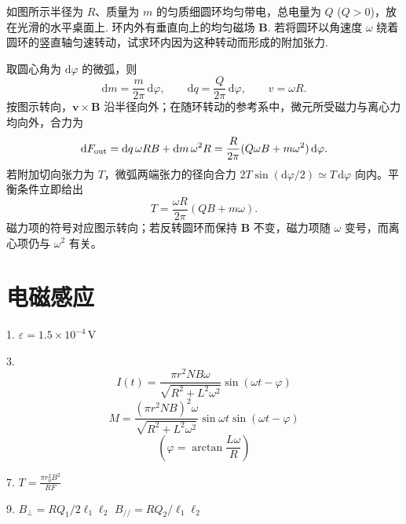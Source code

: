 \begin{exercise}\label{ex:17.13}
如图所示半径为 $R$、质量为 $m$ 的匀质细圆环均匀带电，总电量为 $Q$ ($Q>0$)，放在光滑的水平桌面上. 环内外有垂直向上的均匀磁场 $\boldsymbol{B}$. 若将圆环以角速度 $\omega$ 绕着圆环的竖直轴匀速转动，试求环内因为这种转动而形成的附加张力.
\begin{center}
\end{center}
\end{exercise}
\begin{solution}
取圆心角为 $\mathrm{d}\varphi$ 的微弧，则
\[
\mathrm{d}m=\frac{m}{2\pi}\,\mathrm{d}\varphi,\qquad
\mathrm{d}q=\frac{Q}{2\pi}\,\mathrm{d}\varphi,\qquad
v=\omega R.
\]
按图示转向，$\boldsymbol v\times\boldsymbol B$ 沿半径向外；在随环转动的参考系中，微元所受磁力与离心力均向外，合力为
\[
\mathrm{d}F_{\rm out}
=\mathrm{d}q\,\omega RB+\mathrm{d}m\,\omega^2R
=\frac{R}{2\pi}(Q\omega B+m\omega^2)\,\mathrm{d}\varphi.
\]
若附加切向张力为 $T$，微弧两端张力的径向合力
$2T\sin(\mathrm{d}\varphi/2)\simeq T\,\mathrm{d}\varphi$ 向内。平衡条件立即给出
\[
\boxed{T=\frac{\omega R}{2\pi}(QB+m\omega)}.
\]
磁力项的符号对应图示转向；若反转圆环而保持 $\boldsymbol B$ 不变，磁力项随 $\omega$ 变号，而离心项仍与 $\omega^2$ 有关。
\end{solution}



\chapter{电磁感应}

\begin{oddanswers}
1. $\varepsilon = 1.5 \times 10^{-4}\,\mathrm{V}$

3. 
$$I(t) = \frac{\pi r^2 N B \omega}{\sqrt{R^2 + L^2 \omega^2}} \sin(\omega t - \varphi)$$
$$M = \frac{(\pi r^2 N B)^2 \omega}{\sqrt{R^2 + L^2 \omega^2}} \sin\omega t \sin(\omega t - \varphi)$$
$$\left( \varphi = \arctan \frac{L\omega}{R} \right)$$

7. $T = \frac{\pi r_0^2 B^2}{RF}$

9. $B_{\perp} = RQ_1 / 2\ell_1\ell_2$
$B_{//} = RQ_2 / \ell_1\ell_2$
\end{oddanswers}

